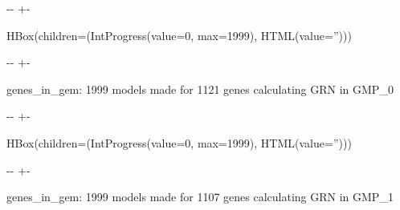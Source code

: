 \documentclass[letterpaper,10pt,english]{sphinxmanual}
\newlength\nbsphinxcodecellspacing
\begin{document}
{

\kern-\sphinxverbatimsmallskipamount\kern-\baselineskip
\kern+\FrameHeightAdjust\kern-\fboxrule
\vspace{\nbsphinxcodecellspacing}

\begin{sphinxVerbatim}[commandchars=\\\{\}]
HBox(children=(IntProgress(value=0, max=1999), HTML(value='')))
\end{sphinxVerbatim}
}

{

\kern-\sphinxverbatimsmallskipamount\kern-\baselineskip
\kern+\FrameHeightAdjust\kern-\fboxrule
\vspace{\nbsphinxcodecellspacing}

\begin{sphinxVerbatim}[commandchars=\\\{\}]

genes\_in\_gem: 1999
models made for 1121 genes
calculating GRN in GMP\_0
\end{sphinxVerbatim}
}

{

\kern-\sphinxverbatimsmallskipamount\kern-\baselineskip
\kern+\FrameHeightAdjust\kern-\fboxrule
\vspace{\nbsphinxcodecellspacing}

\begin{sphinxVerbatim}[commandchars=\\\{\}]
HBox(children=(IntProgress(value=0, max=1999), HTML(value='')))
\end{sphinxVerbatim}
}

{

\kern-\sphinxverbatimsmallskipamount\kern-\baselineskip
\kern+\FrameHeightAdjust\kern-\fboxrule
\vspace{\nbsphinxcodecellspacing}

\begin{sphinxVerbatim}[commandchars=\\\{\}]

genes\_in\_gem: 1999
models made for 1107 genes
calculating GRN in GMP\_1
\end{sphinxVerbatim}
}
\end{document}
